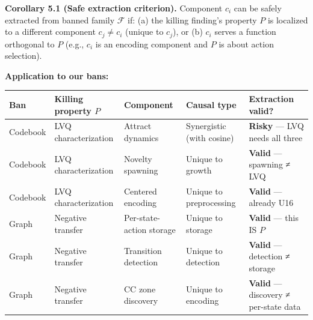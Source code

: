 \documentclass[
  11pt,
]{article}
\newcounter{none} %
\begin{document}
\textbf{Corollary 5.1 (Safe extraction criterion).} Component \(c_i\)
can be safely extracted from banned family \(\mathcal{F}\) if: (a) the
killing finding's property \(P\) is localized to a different component
\(c_j \neq c_i\) (unique to \(c_j\)), or (b) \(c_i\) serves a function
orthogonal to \(P\) (e.g., \(c_i\) is an encoding component and \(P\) is
about action selection).

\textbf{Application to our bans:}

{\def\LTcaptype{none} %
\begin{longtable}[]{@{}
  >{\raggedright\arraybackslash}p{}
  >{\raggedright\arraybackslash}p{}
  >{\raggedright\arraybackslash}p{}
  >{\raggedright\arraybackslash}p{}
  >{\raggedright\arraybackslash}p{}@{}}
\toprule\noalign{}
\begin{minipage}[b]{\linewidth}\raggedright
Ban
\end{minipage} & \begin{minipage}[b]{\linewidth}\raggedright
Killing property \(P\)
\end{minipage} & \begin{minipage}[b]{\linewidth}\raggedright
Component
\end{minipage} & \begin{minipage}[b]{\linewidth}\raggedright
Causal type
\end{minipage} & \begin{minipage}[b]{\linewidth}\raggedright
Extraction valid?
\end{minipage} \\
\midrule\noalign{}
\endhead
\bottomrule\noalign{}
\endlastfoot
Codebook & LVQ characterization & Attract dynamics & Synergistic (with
cosine) & \textbf{Risky} --- LVQ needs all three \\
Codebook & LVQ characterization & Novelty spawning & Unique to growth &
\textbf{Valid} --- spawning ≠ LVQ \\
Codebook & LVQ characterization & Centered encoding & Unique to
preprocessing & \textbf{Valid} --- already U16 \\
Graph & Negative transfer & Per-state-action storage & Unique to storage
& \textbf{Valid} --- this IS \(P\) \\
Graph & Negative transfer & Transition detection & Unique to detection &
\textbf{Valid} --- detection ≠ storage \\
Graph & Negative transfer & CC zone discovery & Unique to encoding &
\textbf{Valid} --- discovery ≠ per-state data \\
\end{longtable}
}
\end{document}
